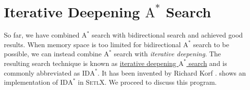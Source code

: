 \section{Iterative Deepening $\mathrm{A}^*$ Search}
So far, we have combined $\mathrm{A}^*$ search with bidirectional search and achieved good results.  When
memory space is too limited for bidirectional $\mathrm{A}^*$ search to be possible, we can instead
combine $\mathrm{A}^*$ search with \emph{iterative deepening}.  The resulting search technique is known as 
\href{https://en.wikipedia.org/wiki/Iterative_deepening_A*}{\color{blue}iterative deepening $\mathrm{A}^*$ search} 
and is commonly abbreviated as $\mathrm{IDA}^*$.  It has been invented by Richard Korf \cite{korf:1985}.
shows an implementation of $\mathrm{IDA}^*$ in \textsc{SetlX}.  We proceed to discuss this program.

